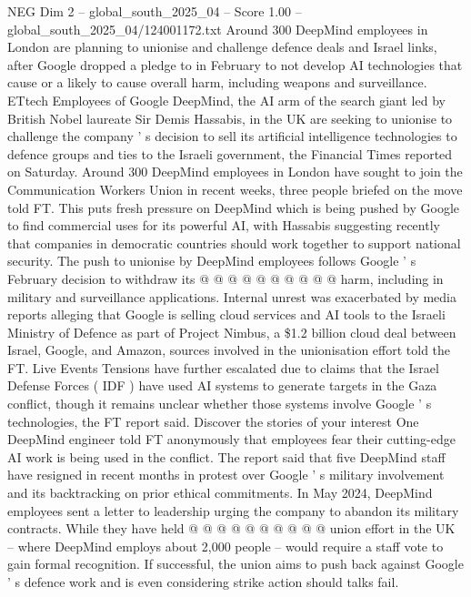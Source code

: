 \begin{textsample}{NEG Dim 2 – global\_south\_2025\_04 – Score 1.00 – global\_south\_2025\_04/124001172.txt}  \label{ex:f2_neg_176}
Around 300 DeepMind employees in London are planning to unionise and challenge defence deals and Israel links, after Google dropped a pledge to in February to not develop AI technologies that cause or a likely to cause overall harm, including weapons and surveillance.
ETtech Employees of Google DeepMind, the AI arm of the search giant led by British Nobel laureate Sir Demis Hassabis, in the UK are seeking to unionise to challenge the company ' s decision to sell its artificial intelligence technologies to defence groups and ties to the Israeli government, the Financial Times reported on Saturday.
Around 300 DeepMind employees in London have sought to join the Communication Workers Union in recent weeks, three people briefed on the move told FT.
This puts fresh pressure on DeepMind which is being pushed by Google to find commercial uses for its powerful AI, with Hassabis suggesting recently that companies in democratic countries should work together to support national security.
The push to unionise by DeepMind employees follows Google ' s February decision to withdraw its @ @ @ @ @ @ @ @ @ @ harm, including in military and surveillance applications.
Internal unrest was exacerbated by media reports alleging that Google is selling cloud services and AI tools to the Israeli Ministry of Defence as part of Project Nimbus, a \$1.2 billion cloud deal between Israel, Google, and Amazon, sources involved in the unionisation effort told the FT.
Live Events Tensions have further escalated due to claims that the Israel Defense Forces ( IDF ) have used AI systems to generate targets in the Gaza conflict, though it remains unclear whether those systems involve Google ' s technologies, the FT report said.
Discover the stories of your interest One DeepMind engineer told FT anonymously that employees fear their cutting-edge AI work is being used in the conflict.
The report said that five DeepMind staff have resigned in recent months in protest over Google ' s military involvement and its backtracking on prior ethical commitments.
In May 2024, DeepMind employees sent a letter to leadership urging the company to abandon its military contracts.
While they have held @ @ @ @ @ @ @ @ @ @ union effort in the UK -- where DeepMind employs about 2,000 people -- would require a staff vote to gain formal recognition.
If successful, the union aims to push back against Google ' s defence work and is even considering strike action should talks fail.

\end{textsample}
